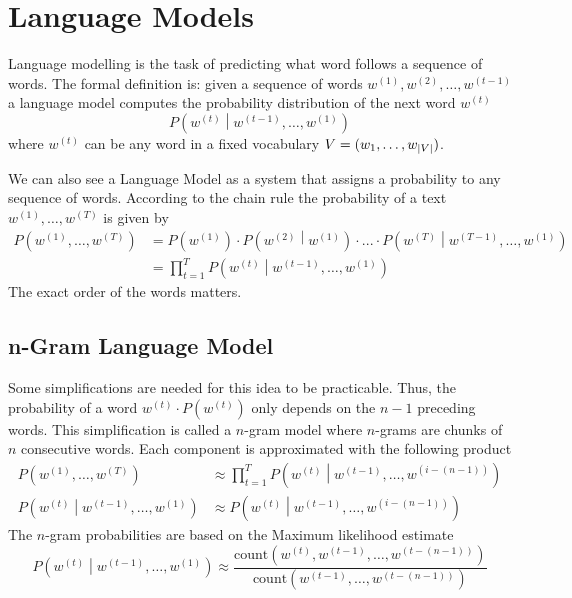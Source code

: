 \documentclass[11pt]{article}
\DeclarePairedDelimiter\abs{\lvert}{\rvert}
\begin{document}
\section{Language Models}
Language modelling is the task of predicting what word follows a sequence of words. The formal definition is: given a sequence of words $w^{(1)}, w^{(2)},\dots, w^{(t-1)}$ a language model computes the probability distribution of the next word $w^{(t)}$
\begin{equation*}
	P\left(w^{(t)} \middle| w^{(t-1)}, \dots, w^{(1)} \right)
\end{equation*}
where $w^{(t)}$ can be any word in a fixed vocabulary $V = (w_1,\dots,w_{\abs{V}})$.

We can also see a Language Model as a system that assigns a probability to any sequence of words. According to the chain rule the probability of a text $w^{(1)},\dots, w^{(T)}$ is given by
\begin{align*}
	P\left(w^{(1)},\dots, w^{(T)}\right) &= P\left(w^{(1)}\right) \cdot P\left(w^{(2)} \middle| w^{(1)}\right) \cdot ... \cdot P\left(w^{(T)} \middle| w^{(T-1)},\dots, w^{(1)}\right)\\
	&= \prod_{t=1}^{T} P\left( w^{(t)} \middle| w^{(t-1)}, \dots, w^{(1)} \right)
\end{align*}
The exact order of the words matters.

\subsection{n-Gram Language Model}
Some simplifications are needed for this idea to be practicable. Thus, the probability of a word $w^{(t)} \cdot P\left(w^{(t)}\right)$ only depends on the $n-1$ preceding words. This simplification is called a $n$-gram model where $n$-grams are chunks of $n$ consecutive words. Each component is approximated with the following product
\begin{align*}
	P\left( w^{(1)}, \dots, w^{(T)} \right) &\approx \prod_{t=1}^{T} P\left( w^{(t)} \middle| w^{(t-1)},\dots, w^{(i-(n-1))} \right)\\
	P\left( w^{(t)} \middle| w^{(t-1)},\dots, w^{(1)} \right) &\approx P\left( w^{(t)} \middle| w^{(t-1)},\dots, w^{(i-(n-1))} \right)
\end{align*}
The $n$-gram probabilities are based on the Maximum likelihood estimate
\begin{equation*}
	P\left( w^{(t)} \middle| w^{(t-1)},\dots, w^{(1)} \right) \approx \frac{\text{count}\left(w^{(t)}, w^{(t-1)},\dots, w^{(t-(n-1))}\right)}{\text{count}\left(w^{(t-1)},\dots, w^{(t-(n-1))}\right)}
\end{equation*}
\end{document}
